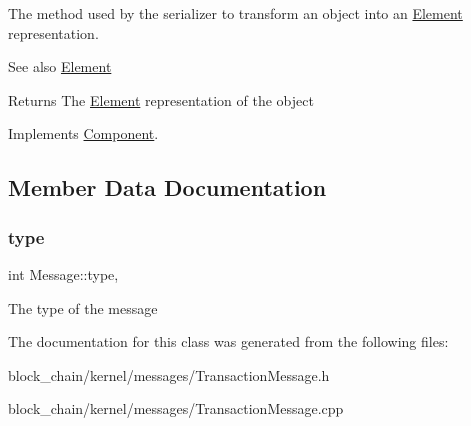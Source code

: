The method used by the serializer to transform an object into an \mbox{\hyperlink{classElement}{Element}} representation. \begin{DoxySeeAlso}{See also}
\mbox{\hyperlink{classElement}{Element}}
\end{DoxySeeAlso}
\begin{DoxyReturn}{Returns}
The \mbox{\hyperlink{classElement}{Element}} representation of the object 
\end{DoxyReturn}


Implements \mbox{\hyperlink{classComponent_a3e63d8c993e417a4af3f56d65ebfc7ea}{Component}}.



\subsection{Member Data Documentation}
\mbox{\label{classMessage_afbfb481c98b13d0deba0bac443bebe29}} 
\subsubsection{\texorpdfstring{type}{type}}
{\footnotesize\ttfamily int Message\+::type\hspace{0.3cm}{\ttfamily [protected]}, {\ttfamily [inherited]}}

The type of the message 

The documentation for this class was generated from the following files\+:\begin{DoxyCompactItemize}
\item 
block\+\_\+chain/kernel/messages/Transaction\+Message.\+h\item 
block\+\_\+chain/kernel/messages/Transaction\+Message.\+cpp\end{DoxyCompactItemize}
